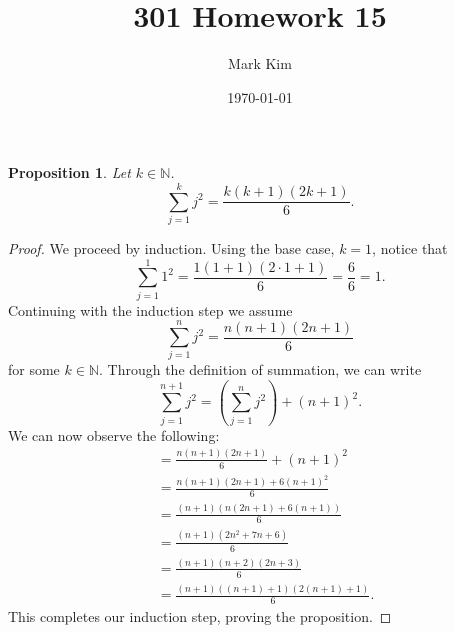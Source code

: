 \documentclass[12pt]{amsart}
\title{301 Homework 15}
\author{Mark Kim}
\date{\today}
\newcommand{\N}{\mathbb{N}}
\newtheorem*{proposition}{Proposition}
\begin{document}
\maketitle

\begin{proposition}
Let $k\in\N$.
\[
\sum_{j=1}^{k}j^2 = \frac{k(k+1)(2k+1)}{6}.
\]
\end{proposition}

\begin{proof}
We proceed by induction. Using the base case, $k=1$, notice that
\[
\sum_{j=1}^{1}1^2 = \frac{1(1+1)(2\cdot 1+1)}{6} = \frac{6}{6} = 1.
\]
Continuing with the induction step we assume
\[
\sum_{j=1}^{n}j^2 = \frac{n(n+1)(2n+1)}{6}
\]
for some $k\in\N$.  Through the definition of summation, we can write
\[
\sum_{j=1}^{n + 1}j^2 = \left(\sum_{j=1}^{n}j^2\right) + (n+1)^2.
\]
We can now observe the following:
\begin{align*}
&= \frac{n(n+1)(2n+1)}{6} + (n+1)^2\\
&= \frac{n(n+1)(2n+1) + 6(n+1)^2}{6}\\
&= \frac{(n+1)(n(2n+1) + 6(n+1))}{6}\\
&= \frac{(n+1)(2n^2 + 7n + 6)}{6}\\
&= \frac{(n+1)(n + 2)(2n + 3)}{6}\\
&= \frac{(n+1)((n + 1) + 1)(2(n + 1) + 1)}{6}.
\end{align*}
This completes our induction step, proving the proposition.
\end{proof}
\end{document}
